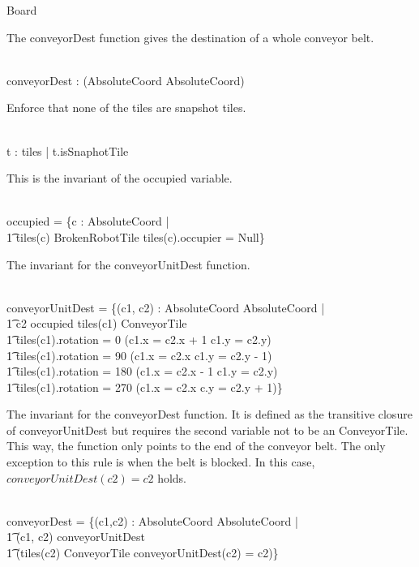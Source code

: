 \begin{class}{Board}
\begin{notopstate}
\begin{zpar}
The conveyorDest function gives the destination of a whole conveyor belt.
\end{zpar} \\
conveyorDest : \power (AbsoluteCoord \pinj AbsoluteCoord)
\where
\begin{zpar}
Enforce that none of the tiles are snapshot tiles.
\end{zpar} \\
\forall t : \ran tiles | \neg t.isSnaphotTile
\also \also \also
\begin{zpar}
This is the invariant of the occupied variable.
\end{zpar} \\
occupied = \{c : AbsoluteCoord | \\ \t1 tiles(c) \in BrokenRobotTile \vee
tiles(c).occupier \not = Null\} \\
\also \also \also
\begin{zpar}
The invariant for the conveyorUnitDest function.
\end{zpar} \\
conveyorUnitDest = \{(c1, c2) : AbsoluteCoord \times AbsoluteCoord | \\ \t1 c2 \not \in occupied \wedge tiles(c1) \in ConveyorTile \; \; \wedge \\ \t1
        tiles(c1).rotation = 0 \Rightarrow (c1.x = c2.x + 1 \wedge c1.y = c2.y) \; \; \wedge \\ \t1
        tiles(c1).rotation = 90 \Rightarrow (c1.x = c2.x \wedge c1.y = c2.y - 1) \; \; \wedge \\ \t1
        tiles(c1).rotation = 180 \Rightarrow (c1.x = c2.x - 1 \wedge c1.y = c2.y) \; \; \wedge \\ \t1
        tiles(c1).rotation = 270 \Rightarrow (c1.x = c2.x \wedge c.y = c2.y + 1)\}
\also \also \also
\begin{zpar}
The invariant for the conveyorDest function. It is defined as the transitive closure of conveyorUnitDest but requires the second variable not to be
an ConveyorTile. This way, the function only points to the end of the conveyor belt.
The only exception to this rule is when the belt is blocked. In this case, $conveyorUnitDest(c2) = c2$ holds.
\end{zpar} \\
conveyorDest = \{(c1,c2) : AbsoluteCoord \times AbsoluteCoord | \\ \t1 (c1, c2) \in conveyorUnitDest \star \; \; \wedge \\ \t1 (tiles(c2) \not \in ConveyorTile \vee conveyorUnitDest(c2) = c2)\}

\end{notopstate}
\end{class}
